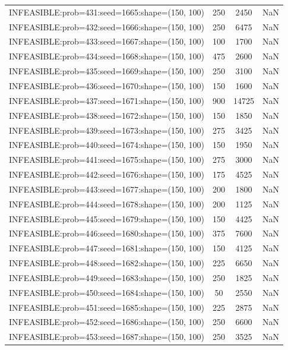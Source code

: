 \begin{longtable}{lccc}
INFEASIBLE:prob=431:seed=1665:shape=(150, 100) &      250 &  2450 &    NaN \\
INFEASIBLE:prob=432:seed=1666:shape=(150, 100) &      250 &  6475 &    NaN \\
INFEASIBLE:prob=433:seed=1667:shape=(150, 100) &      100 &  1700 &    NaN \\
INFEASIBLE:prob=434:seed=1668:shape=(150, 100) &      475 &  2600 &    NaN \\
INFEASIBLE:prob=435:seed=1669:shape=(150, 100) &      250 &  3100 &    NaN \\
INFEASIBLE:prob=436:seed=1670:shape=(150, 100) &      150 &  1600 &    NaN \\
INFEASIBLE:prob=437:seed=1671:shape=(150, 100) &      900 & 14725 &    NaN \\
INFEASIBLE:prob=438:seed=1672:shape=(150, 100) &      150 &  1850 &    NaN \\
INFEASIBLE:prob=439:seed=1673:shape=(150, 100) &      275 &  3425 &    NaN \\
INFEASIBLE:prob=440:seed=1674:shape=(150, 100) &      150 &  1950 &    NaN \\
INFEASIBLE:prob=441:seed=1675:shape=(150, 100) &      275 &  3000 &    NaN \\
INFEASIBLE:prob=442:seed=1676:shape=(150, 100) &      175 &  4525 &    NaN \\
INFEASIBLE:prob=443:seed=1677:shape=(150, 100) &      200 &  1800 &    NaN \\
INFEASIBLE:prob=444:seed=1678:shape=(150, 100) &      200 &  1125 &    NaN \\
INFEASIBLE:prob=445:seed=1679:shape=(150, 100) &      150 &  4425 &    NaN \\
INFEASIBLE:prob=446:seed=1680:shape=(150, 100) &      375 &  7600 &    NaN \\
INFEASIBLE:prob=447:seed=1681:shape=(150, 100) &      150 &  4125 &    NaN \\
INFEASIBLE:prob=448:seed=1682:shape=(150, 100) &      225 &  6650 &    NaN \\
INFEASIBLE:prob=449:seed=1683:shape=(150, 100) &      250 &  1825 &    NaN \\
INFEASIBLE:prob=450:seed=1684:shape=(150, 100) &       50 &  2550 &    NaN \\
INFEASIBLE:prob=451:seed=1685:shape=(150, 100) &      225 &  2875 &    NaN \\
INFEASIBLE:prob=452:seed=1686:shape=(150, 100) &      250 &  6600 &    NaN \\
INFEASIBLE:prob=453:seed=1687:shape=(150, 100) &      250 &  3525 &    NaN \\

\end{longtable}
